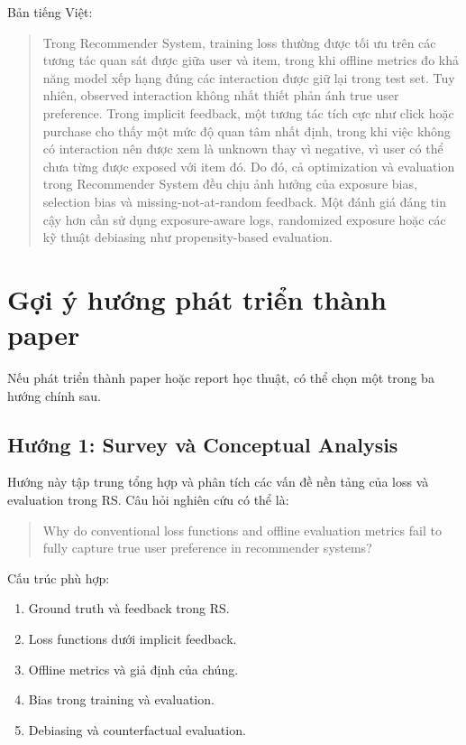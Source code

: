 \documentclass[12pt,a4paper]{article}
\begin{document}
Bản tiếng Việt:

\begin{quote}
Trong Recommender System, training loss thường được tối ưu trên các tương tác quan sát được giữa user và item, trong khi offline metrics đo khả năng model xếp hạng đúng các interaction được giữ lại trong test set. Tuy nhiên, observed interaction không nhất thiết phản ánh true user preference. Trong implicit feedback, một tương tác tích cực như click hoặc purchase cho thấy một mức độ quan tâm nhất định, trong khi việc không có interaction nên được xem là unknown thay vì negative, vì user có thể chưa từng được exposed với item đó. Do đó, cả optimization và evaluation trong Recommender System đều chịu ảnh hưởng của exposure bias, selection bias và missing-not-at-random feedback. Một đánh giá đáng tin cậy hơn cần sử dụng exposure-aware logs, randomized exposure hoặc các kỹ thuật debiasing như propensity-based evaluation.
\end{quote}

\section{Gợi ý hướng phát triển thành paper}

Nếu phát triển thành paper hoặc report học thuật, có thể chọn một trong ba hướng chính sau.

\subsection{Hướng 1: Survey và Conceptual Analysis}

Hướng này tập trung tổng hợp và phân tích các vấn đề nền tảng của loss và evaluation trong RS. Câu hỏi nghiên cứu có thể là:

\begin{quote}
Why do conventional loss functions and offline evaluation metrics fail to fully capture true user preference in recommender systems?
\end{quote}

Cấu trúc phù hợp:

\begin{enumerate}[leftmargin=*]
    \item Ground truth và feedback trong RS.
    \item Loss functions dưới implicit feedback.
    \item Offline metrics và giả định của chúng.
    \item Bias trong training và evaluation.
    \item Debiasing và counterfactual evaluation.
\end{enumerate}
\end{document}
